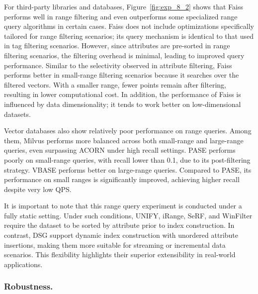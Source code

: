 \documentclass[sigconf, nonacm]{acmart}
\begin{document}
	For third-party libraries and databases, Figure~\ref{fig:exp_8_2} shows that Faiss performs well in range filtering and even outperforms some specialized range query algorithms in certain cases. Faiss does not include optimizations specifically tailored for range filtering scenarios; its query mechanism is identical to that used in tag filtering scenarios. However, since attributes are pre-sorted in range filtering scenarios, the filtering overhead is minimal, leading to improved query performance. Similar to the selectivity observed in attribute filtering, Faiss performs better in small-range filtering scenarios because it searches over the filtered vectors. With a smaller range, fewer points remain after filtering, resulting in lower computational cost. In addition, the performance of Faiss is influenced by data dimensionality; it tends to work better on low-dimensional datasets.
	
	Vector databases also show relatively poor performance on range queries. Among them, Milvus performs more balanced across both small-range and large-range queries, even surpassing ACORN under high recall settings. PASE performs poorly on small-range queries, with recall lower than 0.1, due to its post-filtering strategy. VBASE performs better on large-range queries. Compared to PASE, its performance on small ranges is significantly improved, achieving higher recall despite very low QPS.
	
	
	
	It is important to note that this range query experiment is conducted under a fully static setting. Under such conditions, UNIFY, iRange, SeRF, and WinFilter require the dataset to be sorted by attribute prior to index construction. In contrast, DSG  support dynamic index construction with unordered attribute insertions, making them more suitable for streaming or incremental data scenarios. This flexibility highlights their superior extensibility in real-world applications.
	\subsubsection{Robustness.}
	
\end{document}
